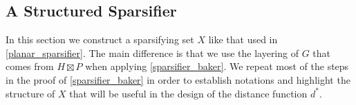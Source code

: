 \documentclass{patmorin}
\renewcommand{\le}{\leqslant}
\newcommand{\pat}[1]{\textcolor{Maroon}{Pat: #1}}
\DeclareMathOperator{\tw}{tw}
\begin{document}
\subsection{A Structured Sparsifier}

In this section we construct a sparsifying set $X$ like that used in \cref{planar_sparsifier}.  The main difference is that we use the layering of $G$ that comes from $H\boxtimes P$ when applying \cref{sparsifier_baker}.  We repeat most of the steps in the proof of \cref{sparsifier_baker} in order to establish notations and highlight the structure of $X$ that will be useful in the design of the distance function $d^*$.

%
%
\end{document}
